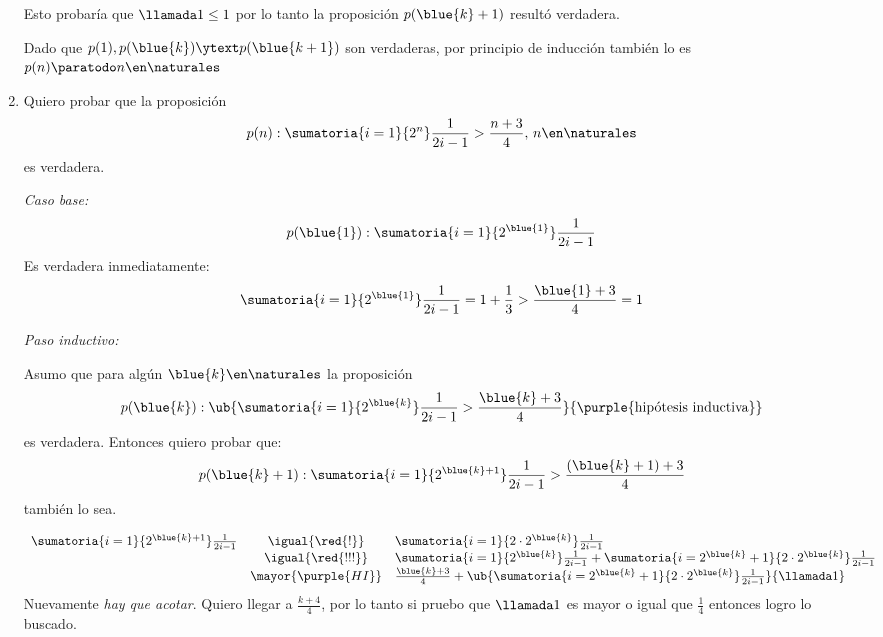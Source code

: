 \begin{enumerate}[label=\magenta{\roman*)}]
        \medskip

        Esto probaría que $\llamada1 \leq 1$ por lo tanto la proposición $p({\blue{k} + 1})$ resultó verdadera.

        Dado que $p(1), p(\blue{k}) \ytext p(\blue{k + 1})$ son verdaderas,
        por principio de inducción también lo es $p(n) \paratodo n \en \naturales$

  \item
        Quiero probar que la proposición
        $$
          p(n):  \sumatoria{i=1}{2^n} \frac{1}{2i-1} > \frac{n+3}{4}, \, n \en \naturales
        $$
        es verdadera.

        \textit{Caso base:}
        $$
          p(\blue{1}) : \sumatoria{i=1}{2^{\blue{1}}} \frac{1}{2i - 1}
        $$
        Es verdadera inmediatamente:
        $$
          \sumatoria{i=1}{2^{\blue{1}}} \frac{1}{2i - 1} = 1 + \frac{1}{3} > \frac{\blue{1} + 3}{4} = 1
        $$

        \textit{Paso inductivo:}

        Asumo que para algún $\blue{k} \en \naturales$ la proposición
        $$
          p(\blue{k}): \ub{
            \sumatoria{i=1}{2^{\blue{k}}} \frac{1}{2i-1} > \frac{\blue{k} + 3}{4}
          }{
            \text{\purple{hipótesis inductiva}}
          }
        $$
        es verdadera. Entonces quiero probar que:
        $$
          p(\blue{k} + 1): \sumatoria{i=1}{2^{\blue{k} + 1}} \frac{1}{2i-1} > \frac{(\blue{k} + 1) + 3}{4}
        $$
        también lo sea.

        $$
          \begin{array}{rcl}
            \sumatoria{i=1}{2^{\blue{k} + 1}} \frac{1}{2i-1}
             & \igual{\red{!}}     &
            \sumatoria{i=1}{2 \cdot 2^{\blue{k}}} \frac{1}{2i-1}                                                         \\
             & \igual{\red{!!!}}   &
            \sumatoria{i=1}{2^{\blue{k}}} \frac{1}{2i-1}
            +
            \sumatoria{i=2^{\blue{k}} + 1}{2 \cdot 2^{\blue{k}}} \frac{1}{2i-1}                                          \\
             & \mayor{\purple{HI}} &
            \frac{\blue{k} + 3}{4} + \ub{\sumatoria{i=2^{\blue{k}} + 1}{2 \cdot 2^{\blue{k}}} \frac{1}{2i-1}}{\llamada1} \\
          \end{array}
        $$
        Nuevamente \textit{hay que acotar}. Quiero llegar a $\frac{k + 4}{4}$, por lo tanto si pruebo que $\llamada1$
        es mayor o igual que $\frac{1}{4}$ entonces logro lo buscado.


\end{enumerate}
